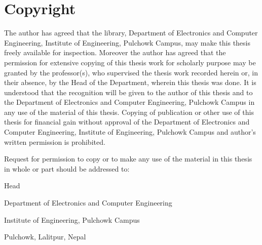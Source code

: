 \chapter*{Copyright}
\doublespacing

The author has agreed that the library, Department of Electronics and Computer Engineering,
Institute of Engineering, Pulchowk Campus, may make this thesis freely available for inspection. Moreover the author has agreed that the permission for extensive copying of this thesis work for scholarly purpose may be granted by the professor(s), who supervised the thesis work recorded herein or, in their absence, by the Head of the Department, wherein this thesis was done. It is understood that the recognition will be given to the author of this thesis and to the Department of Electronics and Computer Engineering, Pulchowk Campus in any use of the material of this thesis. Copying of publication or other use of this thesis for financial gain without approval of the Department of Electronics and Computer Engineering, Institute of Engineering, Pulchowk Campus and author’s written permission is prohibited.

Request for permission to copy or to make any use of the material in this thesis in whole or part should be addressed to:

{\vspace{3cm}}

Head

Department of Electronics and Computer Engineering

Institute of Engineering, Pulchowk Campus

Pulchowk, Lalitpur, Nepal


